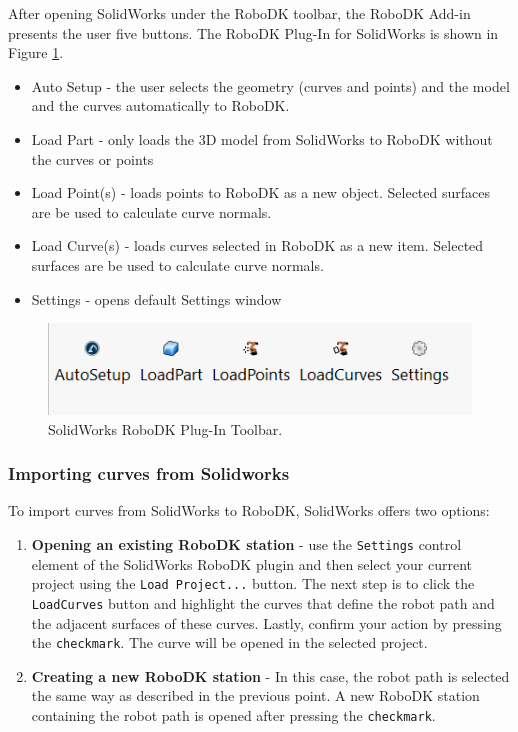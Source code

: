 After opening SolidWorks under the RoboDK toolbar, the RoboDK Add-in presents the user five buttons. The RoboDK Plug-In for SolidWorks is shown in Figure  \ref{fig:solidworkstoolbar}. 

\begin{itemize}
    \item Auto Setup - the user selects the geometry (curves and points) and the model and the curves automatically to RoboDK.
    \item Load Part - only loads the 3D model from SolidWorks to RoboDK without the curves or points
    \item Load Point(s) - loads points to RoboDK as a new object. Selected surfaces are be used to calculate curve normals. 
    \item Load Curve(s) -  loads curves selected in RoboDK as a new item. Selected surfaces are be used to calculate curve normals. 
    \item Settings - opens default Settings window
\end{itemize}

\begin{figure}[h]
    \centering
    \includegraphics[width=0.6\linewidth]{img/solidworks_toolbar.PNG}
    \caption{SolidWorks RoboDK Plug-In Toolbar.}
    \label{fig:solidworkstoolbar}
\end{figure}


\subsubsection*{Importing curves from Solidworks}

To import curves from SolidWorks to RoboDK, SolidWorks offers two options:

\begin{enumerate}

\item \textbf{Opening an existing RoboDK station} - use the \texttt{Settings} control element of the SolidWorks RoboDK plugin and then select your current project using the \texttt{Load Project...} button. The next step is to click the \texttt{LoadCurves} button and highlight the curves that define the robot path and the adjacent surfaces of these curves. Lastly, confirm your action by pressing the \texttt{checkmark}. The curve will be opened in the selected project. 

\item \textbf{Creating a new RoboDK station} - In this case, the robot path is selected the same way as described in the previous point. A new RoboDK station containing the robot path is opened after pressing the \texttt{checkmark}.

\end{enumerate}


